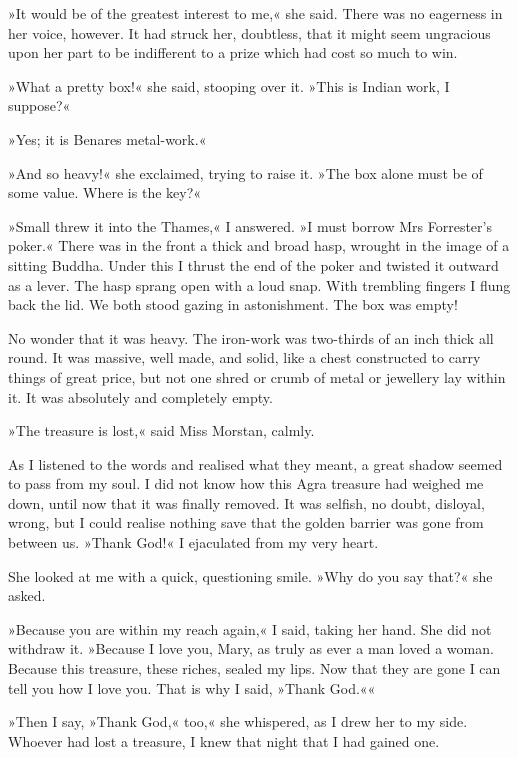 »It would be of the greatest interest to me,« she said. There was no eagerness in her voice, however. It had struck her, doubtless, that it might seem ungracious upon her part to be indifferent to a prize which had cost so much to win.

»What a pretty box!« she said, stooping over it. »This is Indian work, I suppose?«

»Yes; it is Benares metal-work.«

»And so heavy!« she exclaimed, trying to raise it. »The box alone must be of some value. Where is the key?«

»Small threw it into the Thames,« I answered. »I must borrow Mrs Forrester's poker.« There was in the front a thick and broad hasp, wrought in the image of a sitting Buddha. Under this I thrust the end of the poker and twisted it outward as a lever. The hasp sprang open with a loud snap. With trembling fingers I flung back the lid. We both stood gazing in astonishment. The box was empty!

No wonder that it was heavy. The iron-work was two-thirds of an inch thick all round. It was massive, well made, and solid, like a chest constructed to carry things of great price, but not one shred or crumb of metal or jewellery lay within it. It was absolutely and completely empty.

»The treasure is lost,« said Miss Morstan, calmly.

As I listened to the words and realised what they meant, a great shadow seemed to pass from my soul. I did not know how this Agra treasure had weighed me down, until now that it was finally removed. It was selfish, no doubt, disloyal, wrong, but I could realise nothing save that the golden barrier was gone from between us. »Thank God!« I ejaculated from my very heart.

She looked at me with a quick, questioning smile. »Why do you say that?« she asked.

»Because you are within my reach again,« I said, taking her hand. She did not withdraw it. »Because I love you, Mary, as truly as ever a man loved a woman. Because this treasure, these riches, sealed my lips. Now that they are gone I can tell you how I love you. That is why I said, »Thank God.««

»Then I say, »Thank God,« too,« she whispered, as I drew her to my side. Whoever had lost a treasure, I knew that night that I had gained one.